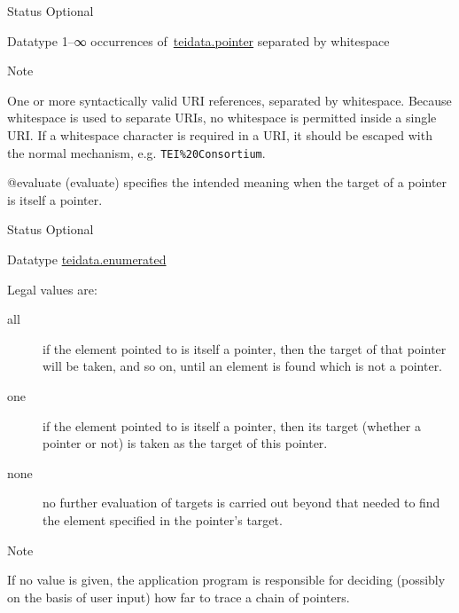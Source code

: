 \begin{reflist}
\begin{sansreflist}
\begin{reflist}
    \item[{Status}]
  Optional
    \item[{Datatype}]
  1–∞ occurrences of \hyperref[TEI.teidata.pointer]{teidata.pointer} separated by whitespace
    \item[{Note}]
  \par
One or more syntactically valid URI references, separated by whitespace. Because whitespace is used to separate URIs, no whitespace is permitted inside a single URI. If a whitespace character is required in a URI, it should be escaped with the normal mechanism, e.g. \texttt{TEI\%20Consortium}.
\end{reflist}  
    \item[@evaluate]
  (evaluate) specifies the intended meaning when the target of a pointer is itself a pointer.
\begin{reflist}
    \item[{Status}]
  Optional
    \item[{Datatype}]
  \hyperref[TEI.teidata.enumerated]{teidata.enumerated}
    \item[{Legal values are:}]
  \begin{description}

\item[{all}]if the element pointed to is itself a pointer, then the target of that pointer will be taken, and so on, until an element is found which is not a pointer.
\item[{one}]if the element pointed to is itself a pointer, then its target (whether a pointer or not) is taken as the target of this pointer.
\item[{none}]no further evaluation of targets is carried out beyond that needed to find the element specified in the pointer's target.
\end{description} 
    \item[{Note}]
  \par
If no value is given, the application program is responsible for deciding (possibly on the basis of user input) how far to trace a chain of pointers.
\end{reflist}  
\end{sansreflist}  
\end{reflist}  
